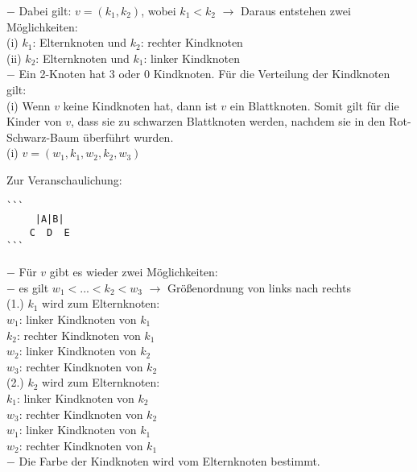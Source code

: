 \begin{addmargin}[1em]{1em}
$-$ Dabei gilt: $v = (k_1, k_2)$, wobei $k_1 < k_2$ $\rightarrow$ Daraus entstehen zwei Möglichkeiten:\\
(i) $k_1$: Elternknoten und $k_2$: rechter Kindknoten\\
(ii) $k_2$: Elternknoten und $k_1$: linker Kindknoten\\
$-$ Ein 2-Knoten hat 3 oder 0 Kindknoten. Für die Verteilung der Kindknoten gilt:\\
(i) Wenn $v$ keine Kindknoten hat, dann ist $v$ ein Blattknoten. Somit gilt für die Kinder von $v$, dass sie zu schwarzen Blattknoten werden, nachdem sie in den Rot-Schwarz-Baum überführt wurden.\\
(i) $v = (w_1,k_1,w_2,k_2,w_3) $\\
\end{addmargin}

\noindent
Zur Veranschaulichung:
\begin{verbatim}
```  
     |A|B|
    C  D  E     
```
\end{verbatim}

\begin{addmargin}[1em]{1em}
$-$ Für $v$ gibt es wieder zwei Möglichkeiten:\\
$-$ es gilt $w_1 < ... < k_2 < w_3$ $\rightarrow$ Größenordnung von links nach rechts\\
(1.) $k_1$ wird zum Elternknoten:\\
$w_1$: linker Kindknoten von $k_1$\\
$k_2$: rechter Kindknoten von $k_1$\\
$w_2$: linker Kindknoten von $k_2$\\
$w_3$: rechter Kindknoten von $k_2$\\
(2.) $k_2$ wird zum Elternknoten:\\
$k_1$: linker Kindknoten von $k_2$\\
$w_3$: rechter Kindknoten von $k_2$\\
$w_1$: linker Kindknoten von $k_1$\\
$w_2$: rechter Kindknoten von $k_1$\\
$-$ Die Farbe der Kindknoten wird vom Elternknoten bestimmt.\\
\end{addmargin}

